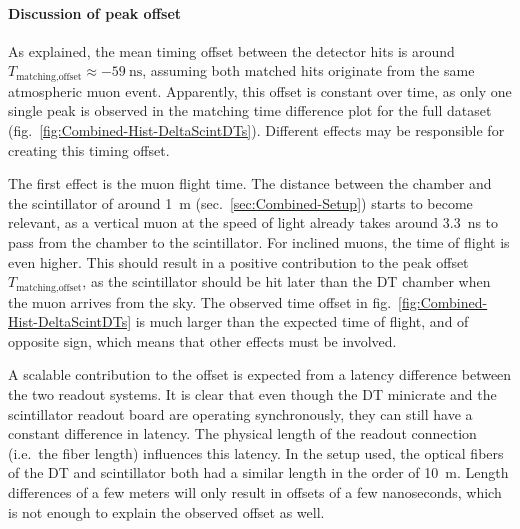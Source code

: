 \paragraph{Discussion of peak offset}
As explained, the mean timing offset between the detector hits is around $T_\text{matching,offset}\approx\SI{-59}{\nano\second}$, assuming both matched hits originate from the same atmospheric muon event. Apparently, this offset is constant over time, as only one single peak is observed in the matching time difference plot for the full dataset (fig.\ \ref{fig:Combined-Hist-DeltaScintDTs}). Different effects may be responsible for creating this timing offset.
\par The first effect is the muon flight time. The distance between the chamber and the scintillator of around \SI{1}{\meter} (sec.\ \ref{sec:Combined-Setup}) starts to become relevant, as a vertical muon at the speed of light already takes around \SI{3.3}{\nano\second} to pass from the chamber to the scintillator. For inclined muons, the time of flight is even higher. This should result in a positive contribution to the peak offset $T_\text{matching,offset}$, as the scintillator should be hit later than the \ac{DT} chamber when the muon arrives from the sky. The observed time offset in fig.\ \ref{fig:Combined-Hist-DeltaScintDTs} is much larger than the expected time of flight, and of opposite sign, which means that other effects must be involved.
\par A scalable contribution to the offset is expected from a latency difference between the two readout systems. It is clear that even though the \ac{DT} minicrate and the scintillator readout board are operating synchronously, they can still have a constant difference in latency. The physical length of the readout connection (i.e.\ the fiber length) influences this latency. In the setup used, the optical fibers of the \ac{DT} and scintillator both had a similar length in the order of \SI{10}{\meter}. Length differences of a few meters will only result in offsets of a few nanoseconds, which is not enough to explain the observed offset as well.
